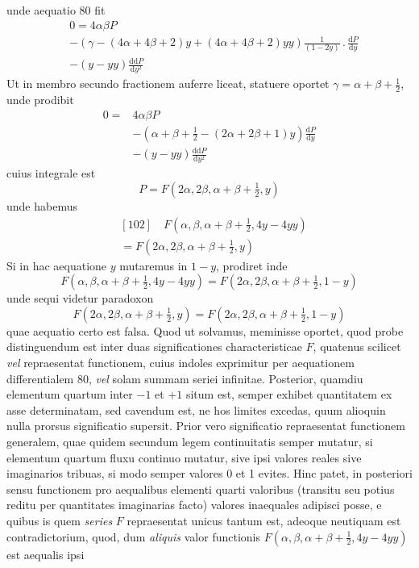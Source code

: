 unde aequatio 80 fit
\[
\begin{aligned}
&0=4\alpha\beta P\\
&-(\gamma-(4\alpha+4\beta+2)y+(4\alpha+4\beta+2)yy)\frac1{(1-2y)}\mathbin{.}\frac{\mathrm dP}{\mathrm dy}\\
&-(y-yy)\frac{\mathrm{dd}P}{\mathrm dy^2}
\end{aligned}
\]
Ut in membro secundo fractionem auferre liceat, statuere oportet $\gamma=\alpha+\beta+\frac12$,
unde prodibit
\[
\begin{aligned}
0={}&4\alpha\beta P\\
&-(\alpha+\beta+\tfrac12-(2\alpha+2\beta+1)y)\frac{\mathrm dP}{\mathrm dy}\\
&-(y-yy)\frac{\mathrm{dd}P}{\mathrm dy^2}
\end{aligned}
\]
cuius integrale est
\[
P=F(2\alpha,2\beta,\alpha+\beta+\tfrac12,y)
\]
unde habemus
\[
\begin{aligned}&[102]\quad F(\alpha,\beta,\alpha+\beta+\tfrac12,4y-4yy)\\&=F(2\alpha,2\beta,\alpha+\beta+\tfrac12,y)\end{aligned}
\]
Si in hac aequatione $y$ mutaremus in $1-y$, prodiret inde
\[
F(\alpha,\beta,\alpha+\beta+\tfrac12,4y-4yy)=F(2\alpha,2\beta,\alpha+\beta+\tfrac12,1-y)
\]
unde sequi videtur paradoxon
\[
F(2\alpha,2\beta,\alpha+\beta+\tfrac12,y)=F(2\alpha,2\beta,\alpha+\beta+\tfrac12,1-y)
\]
quae aequatio certo est falsa. Quod ut solvamus, meminisse oportet, quod probe
distinguendum est inter duas significationes characteristicae $F$, quatenus scilicet
\textit{vel} repraesentat functionem, cuius indoles exprimitur per aequationem differentialem 80, \textit{vel} solam summam seriei infinitae. Posterior, quamdiu elementum
quartum inter $-1$ et $+1$ situm est, semper exhibet quantitatem ex asse determinatam, sed cavendum est, ne hos limites excedas, quum alioquin nulla prorsus significatio supersit. Prior vero significatio repraesentat functionem generalem, quae quidem secundum legem continuitatis semper mutatur, si elementum
quartum fluxu continuo mutatur, sive ipsi valores reales sive imaginarios tribuas,
si modo semper valores 0 et 1 evites. Hinc patet, in posteriori sensu functionem
pro aequalibus elementi quarti valoribus (transitu seu potius reditu per quantitates imaginarias facto) valores inaequales adipisci posse, e quibus is quem \textit{series} $F$
repraesentat unicus tantum est, adeoque neutiquam est contradictorium, quod,
dum \textit{aliquis} valor functionis $F(\alpha,\beta,\alpha+\beta+\frac12,4y-4yy)$ est aequalis ipsi
